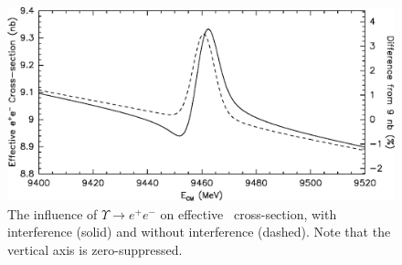 \documentclass{cornell}
\begin{document}
\begin{figure}[p]
  \begin{center}
    \includegraphics[width=\linewidth]{allee}
  \end{center}
  \caption[Influence of $\Upsilon \to e^+e^-$ on effective \ee\
  cross-section]{\label{allee} The influence of $\Upsilon \to e^+e^-$
  on effective \ee\ cross-section, with interference (solid) and
  without interference (dashed).  Note that the vertical axis is
  zero-suppressed.}
\end{figure}
\end{document}
